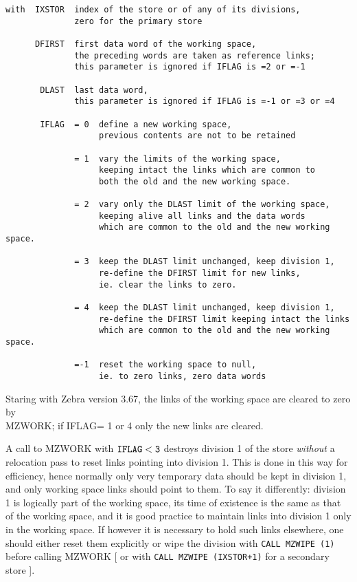 \begin{verbatim}
with  IXSTOR  index of the store or of any of its divisions,
              zero for the primary store

      DFIRST  first data word of the working space,
              the preceding words are taken as reference links;
              this parameter is ignored if IFLAG is =2 or =-1

       DLAST  last data word,
              this parameter is ignored if IFLAG is =-1 or =3 or =4

       IFLAG  = 0  define a new working space,
                   previous contents are not to be retained

              = 1  vary the limits of the working space,
                   keeping intact the links which are common to
                   both the old and the new working space.

              = 2  vary only the DLAST limit of the working space,
                   keeping alive all links and the data words
                   which are common to the old and the new working space.

              = 3  keep the DLAST limit unchanged, keep division 1,
                   re-define the DFIRST limit for new links,    
                   ie. clear the links to zero.             

              = 4  keep the DLAST limit unchanged, keep division 1,
                   re-define the DFIRST limit keeping intact the links
                   which are common to the old and the new working space.

              =-1  reset the working space to null,
                   ie. to zero links, zero data words
\end{verbatim} 
Staring with Zebra version 3.67, the links of the working space
are cleared to zero by \\
MZWORK;
if IFLAG= 1 or 4 only the new links are cleared.


A call to MZWORK with ${\tt IFLAG < 3}$ destroys division 1 of the store
{\em without} a relocation pass to reset links pointing into division 1.
This is done in this way for efficiency,
hence normally only very temporary data should be kept in division 1,
and only working space links should point to them.
To say it differently: division 1 is logically part of the
working space,
its time of existence is the same as that of the working space,
and it is good practice to maintain links into division 1
only in the working space.
If however it is necessary to hold such links elsewhere,
one should either reset them explicitly or wipe the division with
{\tt CALL~MZWIPE~(1)} before calling MZWORK
[ or with {\tt CALL~MZWIPE~(IXSTOR+1)} for a secondary store ].

